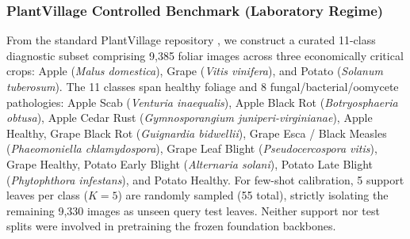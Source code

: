 \documentclass[a4paper,fleqn,nologo]{cas-dc}
\begin{document}
\subsubsection{PlantVillage Controlled Benchmark (Laboratory Regime)}
From the standard PlantVillage repository \cite{hughes2012plantvillage}, we construct a curated 11-class diagnostic subset comprising 9,385 foliar images across three economically critical crops: Apple (\textit{Malus domestica}), Grape (\textit{Vitis vinifera}), and Potato (\textit{Solanum tuberosum}). The 11 classes span healthy foliage and 8 fungal/bacterial/oomycete pathologies: Apple Scab (\textit{Venturia inaequalis}), Apple Black Rot (\textit{Botryosphaeria obtusa}), Apple Cedar Rust (\textit{Gymnosporangium juniperi-virginianae}), Apple Healthy, Grape Black Rot (\textit{Guignardia bidwellii}), Grape Esca / Black Measles (\textit{Phaeomoniella chlamydospora}), Grape Leaf Blight (\textit{Pseudocercospora vitis}), Grape Healthy, Potato Early Blight (\textit{Alternaria solani}), Potato Late Blight (\textit{Phytophthora infestans}), and Potato Healthy. For few-shot calibration, 5 support leaves per class ($K=5$) are randomly sampled (55 total), strictly isolating the remaining 9,330 images as unseen query test leaves. Neither support nor test splits were involved in pretraining the frozen foundation backbones.
\end{document}
